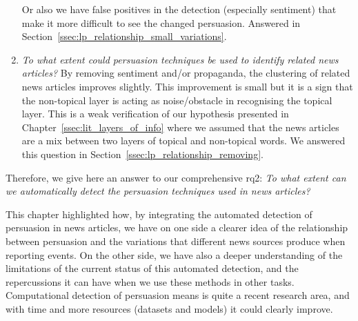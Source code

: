 \begin{enumerate}[label={\textbf{RQ2.\arabic*:}},leftmargin=2cm]
    Or also we have false positives in the detection (especially sentiment) that make it more difficult to see the changed persuasion. Answered in Section~\ref{ssec:lp_relationship_small_variations}.
    \item \emph{To what extent could persuasion techniques be used to identify related news articles?} By removing sentiment and/or propaganda, the clustering of related news articles improves slightly. This improvement is small but it is a sign that the non-topical layer is acting as noise/obstacle in recognising the topical layer. This is a weak verification of our hypothesis presented in Chapter~\ref{ssec:lit_layers_of_info} where we assumed that the news articles are a mix between two layers of topical and non-topical words.  We answered this question in Section~\ref{ssec:lp_relationship_removing}.
\end{enumerate}



Therefore, we give here an answer to our comprehensive \acrshort{rq}2: \emph{To what extent can we automatically detect the persuasion techniques used in news articles?}

This chapter highlighted how, by integrating the automated detection of persuasion in news articles, we have on one side a clearer idea of the relationship between persuasion and the variations that different news sources produce when reporting events.
On the other side, we have also a deeper understanding of the limitations of the current status of this automated detection, and the repercussions it can have when we use these methods in other tasks.
Computational detection of persuasion means is quite a recent research area, and with time and more resources (datasets and models) it could clearly improve.%

